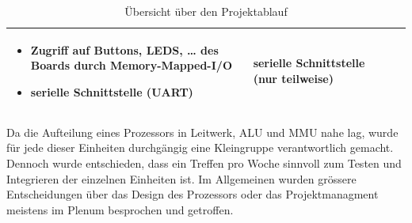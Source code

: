 \begin{table}
\begin{tabular}{|p{50pt}|p{80pt}|p{220pt}|p{110pt}|}
\begin{itemize}[noitemsep,topsep=0pt]
                                                       \item Zugriff auf Buttons, LEDS, \dots{} des Boards durch Memory-Mapped-I/O
                                                       \item serielle Schnittstelle (UART)
                                                       \end{itemize}                                                                    & serielle Schnittstelle (nur teilweise)        \\
\hline
\end{tabular}
\caption{\"Ubersicht \"uber den Projektablauf}
\end{table}

Da die Aufteilung eines Prozessors in Leitwerk, ALU und MMU nahe lag, wurde
f\"ur jede dieser Einheiten durchg\"angig eine Kleingruppe verantwortlich
gemacht. Dennoch wurde entschieden, dass ein Treffen pro Woche sinnvoll zum
Testen und Integrieren der einzelnen Einheiten ist. Im Allgemeinen wurden
gr\"ossere Entscheidungen \"uber das Design des Prozessors oder das
Projektmanagment meistens im Plenum besprochen und getroffen.

